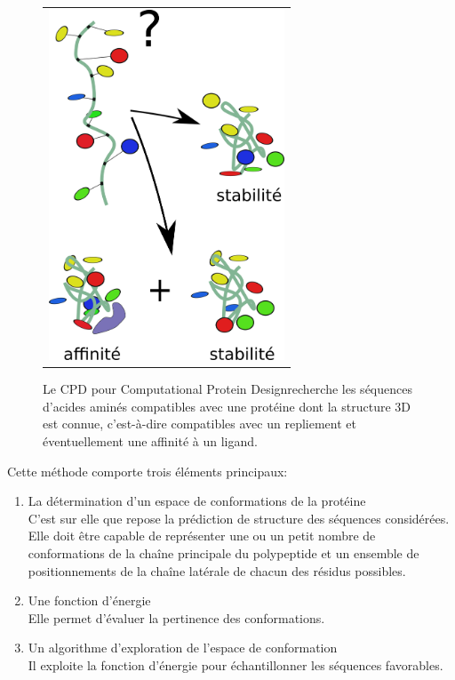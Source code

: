    \begin{figure}[!htbp]
     \centering
     \begin{tabular}{c}
       \includegraphics[width=7cm]{figure/CPD.png} &
     \end{tabular}
     
     \caption{Le CPD pour \og Computational Protein Design\fg recherche les séquences d'acides aminés compatibles avec une protéine dont la structure 3D  est connue, c'est-à-dire compatibles avec un repliement et éventuellement une affinité à un ligand.}
\label{graph:CPD}
   \end{figure}


Cette méthode comporte trois éléments principaux:
\begin{enumerate}
\item La détermination d'un espace de conformations de la protéine\\
C'est sur elle que repose la prédiction de structure des séquences considérées. Elle doit être capable de représenter une ou un petit nombre de conformations de la chaîne principale du polypeptide et un ensemble de positionnements de la chaîne latérale de chacun des résidus possibles.
\item Une fonction d'énergie\\
Elle permet d'évaluer la pertinence des conformations. 
\item Un algorithme d'exploration de l'espace de conformation\\
Il exploite la fonction d'énergie pour échantillonner les séquences favorables.
\end{enumerate}

